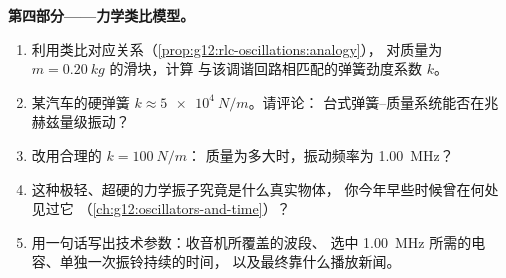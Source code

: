 \begin{problem}
\medskip
\noindent\textbf{第四部分——力学类比模型。}
\begin{enumerate}[resume]
  \item 利用类比对应关系（\cref{prop:g12:rlc-oscillations:analogy}），
        对质量为 $m = \qty{0.20}{kg}$ 的滑块，计算
        与该调谐回路相匹配的弹簧劲度系数 $k$。
  \item 某汽车的硬弹簧 $k \approx \qty{5e4}{N/m}$。请评论：
        台式弹簧–质量系统能否在兆赫兹量级振动？
  \item 改用合理的 $k = \qty{100}{N/m}$：
        质量为多大时，振动频率为 \qty{1.00}{MHz}？
  \item 这种极轻、超硬的力学振子究竟是什么真实物体，
        你今年早些时候曾在何处见过它
        （\cref{ch:g12:oscillators-and-time}）？
  \item 用一句话写出技术参数：收音机所覆盖的波段、
        选中 \qty{1.00}{MHz} 所需的电容、单独一次振铃持续的时间，
        以及最终靠什么播放新闻。
\end{enumerate}
\end{problem}
